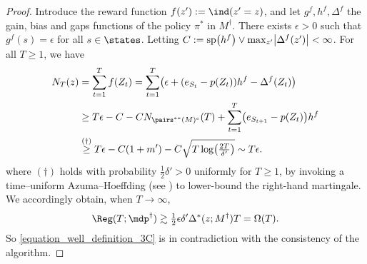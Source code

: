\documentclass[preprint,cleveref,12pt]{colt2025}
\DeclarePairedDelimiter{\parens}{(}{)}	%
\DeclarePairedDelimiter{\abs}{\lvert}{\rvert}	%
\newcommand{\indic}[1]{\ind\parens{#1}}
\def\indicator{\indic}
\def\model{\mdp}
\begin{document}
\begin{proof}
        Introduce the reward function $f(z') := \indicator{z' = z}$, and let $g^f, h^f, \Delta^f$ the gain, bias and gaps functions of the policy $\pi^*$ in $M^\dagger$.
        There exists $\epsilon > 0$ such that $g^f(s) = \epsilon$ for all $s \in \states$.
        Letting $C := \mathrm{sp}\parens*{h^f} \vee \max_{z'} \abs*{\Delta^f(z')} < \infty$.
        For all $T \ge 1$, we have
        \begin{align*}
            N_T(z)
            & = 
            \sum_{t=1}^T f(Z_t)
            = \sum_{t=1}^T 
            \parens*{
                \epsilon + \parens*{e_{S_t} - p(Z_t)}h^f - \Delta^f(Z_t)
            }
            \\
            & \ge
            T \epsilon 
            - C - C N_{\pairs^{**}(M)^c}(T)
            + \sum_{t=1}^T \parens*{e_{S_{t+1}} - p(Z_t)} h^f
            \\
            & \overset{(\dagger)}\ge
            T \epsilon - C (1 + m') - C \sqrt{T \log\parens*{\tfrac {2T}{\delta'}}}
            \sim T \epsilon
            .
        \end{align*}
        where $(\dagger)$ holds with probability $\tfrac 12 \delta' > 0$ uniformly for $T \ge 1$, by invoking a time--uniform Azuma--Hoeffding (see \cite[Lemma~5]{bourel_tightening_2020}) to lower-bound the right-hand martingale.
        We accordingly obtain, when $T \to \infty$,
        \begin{equation}
        \label{equation_well_definition_3C}
            \Reg(T; \model^\dagger)
            \gtrsim \tfrac 12 \epsilon \delta' \Delta^*(z; M^\dagger) T 
            = \Omega(T)
            .
        \end{equation}
        So \eqref{equation_well_definition_3C} is in contradiction with the consistency of the algorithm.
    \end{proof}
\end{document}
